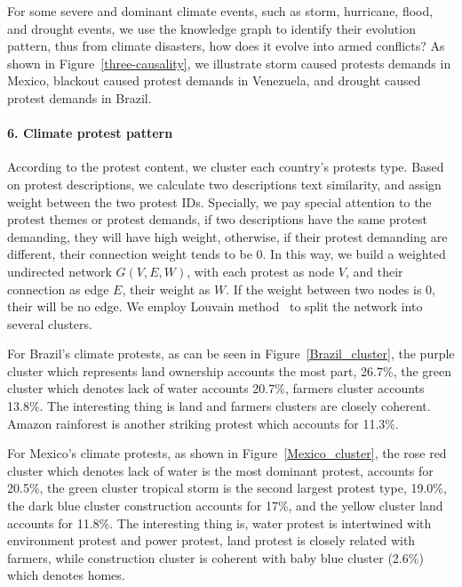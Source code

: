 \documentclass[9pt,twocolumn,twoside]{pnas-new}
\begin{document}

For some severe and dominant climate events, such as storm, hurricane, flood, and drought events, we use the knowledge graph to identify their evolution pattern, thus from climate disasters, how does it evolve into armed conflicts? As shown in Figure~\ref{three-causality}, we illustrate storm caused protests demands in Mexico, blackout caused protest demands in Venezuela, and drought caused protest demands in Brazil.


\paragraph{6. Climate protest pattern}
According to the protest content, we cluster each country's protests type. Based on protest descriptions, we calculate two descriptions text similarity, and assign weight between the two protest IDs. Specially, we pay special attention to the protest themes or protest demands, if two descriptions have the same protest demanding, they will have high weight, otherwise, if their protest demanding are different, their connection weight tends to be 0. In this way, we build a weighted undirected network $G(V, E, W)$, with each protest as node $V$, and their connection as edge $E$, their weight as $W$. If the weight between two nodes is 0, their will be no edge. We employ Louvain method~\cite{blondel2008fast} to split the network into several clusters.


For Brazil's climate protests, as can be seen in Figure~\ref{Brazil_cluster}, the purple cluster which represents land ownership accounts the most part, 26.7\%, the green cluster which denotes lack of water accounts 20.7\%, farmers cluster accounts 13.8\%. The interesting thing is land and farmers clusters are closely coherent. Amazon rainforest is another striking protest which accounts for 11.3\%.

For Mexico's climate protests, as shown in Figure~\ref{Mexico_cluster}, the rose red cluster which denotes lack of water is the most dominant protest, accounts for 20.5\%, the green cluster tropical storm is the second largest protest type, 19.0\%, the dark blue cluster construction accounts for 17\%, and the yellow cluster land accounts for 11.8\%. The interesting thing is, water protest is intertwined with environment protest and power protest, land protest is closely related with farmers, while construction cluster is coherent with baby blue cluster (2.6\%) which denotes homes.
\end{document}
